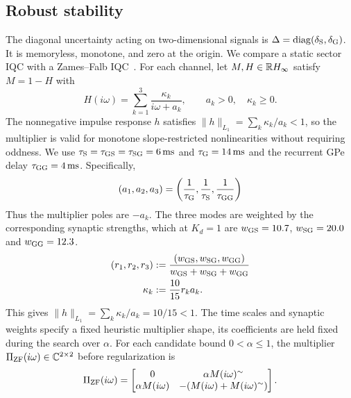\subsection{Robust stability}

The diagonal uncertainty acting on two-dimensional signals is
$\Delta=\operatorname{diag}(\delta_{{\mathrm{S}}},\delta_{{\mathrm{G}}})$. It is memoryless,
monotone, and zero at the origin. We compare a static sector IQC with a
Zames--Falb IQC~\cite{zames1968stability,
turner2022zamesfalbmultipliersdontpanic}. For each channel, let
$M,H\in\mathbb{R} H_\infty$ satisfy $M=1-H$
with
\begin{equation*}
 H(i\omega)=\sum_{k=1}^3\frac{\kappa_{k}}{i\omega+a_{k}},
 \qquad a_{k}>0,\quad\kappa_{k}\geq0.
\end{equation*}
The nonnegative impulse response $h$ satisfies
$\|h\|_{L_1}=\sum_k\kappa_{k}/a_{k}<1$, so the multiplier is valid for
monotone slope-restricted nonlinearities without requiring oddness. We
use $\tau_{{\mathrm{S}}}= \tau_{\mathrm{GS}} = \tau_{\mathrm{SG}}=6\,\mathrm{ms}$ and
$\tau_{{\mathrm{G}}}=14\,\mathrm{ms}$ and the recurrent GPe delay
$\tau_{{\mathrm{GG}}}=4\,\mathrm{ms}$. Specifically,
\begin{equation*}
 (a_{1},a_{2},a_{3})
 =\left(\frac{1}{\tau_{{\mathrm{G}}}},\frac{1}{\tau_{{\mathrm{S}}}},
          \frac{1}{\tau_{{\mathrm{GG}}}}\right)
\end{equation*}
Thus the multiplier poles are $-a_{k}$. The three modes are weighted by the corresponding synaptic
strengths, which at $K_d=1$ are $w_{\mathrm{GS}} = 10.7$, $w_{\mathrm{SG}}=20.0$ and $w_{\mathrm{GG}}=12.3$.
\begin{equation*}
 \begin{aligned}
 (r_1,r_2,r_3)&:=
 \frac{(w_{{\mathrm{GS}}},w_{{\mathrm{SG}}},w_{{\mathrm{GG}}})}
 {w_{{\mathrm{GS}}}+w_{{\mathrm{SG}}}+w_{{\mathrm{GG}}}}\\
 \kappa_{k}&:=\frac{10}{15}r_k a_{k}.
 \end{aligned}
\end{equation*}
This gives $\|h\|_{L_1}=\sum_k\kappa_{k}/a_{k}=10/15<1$.
The time scales and synaptic weights specify a fixed heuristic multiplier
shape, its coefficients are held fixed during the search over $\alpha$.
For each candidate bound $0<\alpha\leq1$, the multiplier
$\Pi_{\mathrm{ZF}}(i\omega)\in\mathbb C^{2\times2}$ before regularization is
\begin{equation*}
 \Pi_{\mathrm{ZF}}(i\omega)=
 \begin{bmatrix}0&\alpha M(i\omega)^\sim\\
       \alpha M(i\omega)&-(M(i\omega)+M(i\omega)^\sim)\end{bmatrix}.
\end{equation*}
